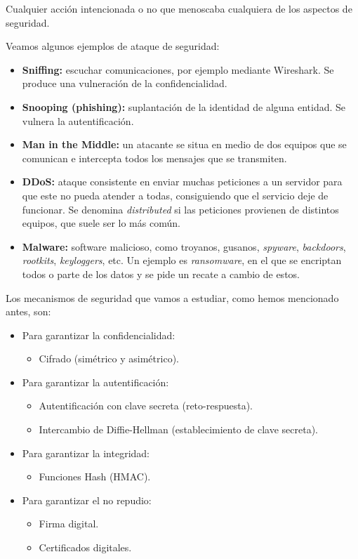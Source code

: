 \begin{definicion}
    Cualquier acción intencionada o no que menoscaba cualquiera de los aspectos de seguridad. 
\end{definicion}

Veamos algunos ejemplos de ataque de seguridad:
\begin{itemize}
    \item \textbf{Sniffing:} escuchar comunicaciones, por ejemplo mediante Wireshark. Se produce una vulneración de la confidencialidad.
    \item \textbf{Snooping (phishing):} suplantación de la identidad de alguna entidad. Se vulnera la autentificación.
    \item \textbf{Man in the Middle:} un atacante se situa en medio de dos equipos que se comunican e intercepta todos los mensajes que se transmiten.
    \item \textbf{\acrfull{DDoS}:} ataque consistente en enviar muchas peticiones a un servidor para que este no pueda atender a todas, consiguiendo que el servicio deje de funcionar. Se denomina \emph{distributed} si las peticiones provienen de distintos equipos, que suele ser lo más común. 
    \item \textbf{Malware:} software malicioso, como troyanos, gusanos, \textit{spyware}, \textit{backdoors}, \textit{rootkits}, \textit{keyloggers}, etc. Un ejemplo es \textit{ransomware}, en el que se encriptan todos o parte de los datos y se pide un recate a cambio de estos.
\end{itemize}


Los mecanismos de seguridad que vamos a estudiar, como hemos mencionado antes, son:
\begin{itemize}
    \item Para garantizar la confidencialidad:
    \begin{itemize}
        \item Cifrado (simétrico y asimétrico).
    \end{itemize}
    \item Para garantizar la autentificación:
    \begin{itemize}
        \item Autentificación con clave secreta (reto-respuesta).
        \item Intercambio de Diffie-Hellman (establecimiento de clave secreta).
    \end{itemize}

    \item Para garantizar la integridad:
    \begin{itemize}
        \item Funciones Hash (\acrfull{HMAC}).
    \end{itemize}

    \item Para garantizar el no repudio:
    \begin{itemize}
        \item Firma digital.
        \item Certificados digitales.
    \end{itemize}
\end{itemize}

